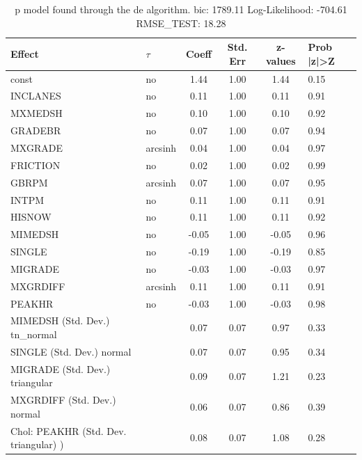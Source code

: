\begin{table}
	\caption{p model found through the de algorithm. bic: 1789.11 Log-Likelihood: -704.61 RMSE_TEST: 18.28}
	\begin{center}
		\begin{tabular}{|l|l|c|c|c|l|}
			\hline
			Effect & $\tau$ & Coeff & Std. Err & z-values & Prob |z|>Z \\
			\hline
			const & no & 1.44 & 1.00 & 1.44 & 0.15 \\
			\hline
			INCLANES & no & 0.11 & 1.00 & 0.11 & 0.91 \\
			\hline
			MXMEDSH & no & 0.10 & 1.00 & 0.10 & 0.92 \\
			\hline
			GRADEBR & no & 0.07 & 1.00 & 0.07 & 0.94 \\
			\hline
			MXGRADE & arcsinh & 0.04 & 1.00 & 0.04 & 0.97 \\
			\hline
			FRICTION & no & 0.02 & 1.00 & 0.02 & 0.99 \\
			\hline
			GBRPM & arcsinh & 0.07 & 1.00 & 0.07 & 0.95 \\
			\hline
			INTPM & no & 0.11 & 1.00 & 0.11 & 0.91 \\
			\hline
			HISNOW & no & 0.11 & 1.00 & 0.11 & 0.92 \\
			\hline
			MIMEDSH & no & -0.05 & 1.00 & -0.05 & 0.96 \\
			\hline
			SINGLE & no & -0.19 & 1.00 & -0.19 & 0.85 \\
			\hline
			MIGRADE & no & -0.03 & 1.00 & -0.03 & 0.97 \\
			\hline
			MXGRDIFF & arcsinh & 0.11 & 1.00 & 0.11 & 0.91 \\
			\hline
			PEAKHR & no & -0.03 & 1.00 & -0.03 & 0.98 \\
			\hline
			MIMEDSH (Std. Dev.) tn_normal &  & 0.07 & 0.07 & 0.97 & 0.33 \\
			\hline
			SINGLE (Std. Dev.) normal &  & 0.07 & 0.07 & 0.95 & 0.34 \\
			\hline
			MIGRADE (Std. Dev.) triangular &  & 0.09 & 0.07 & 1.21 & 0.23 \\
			\hline
			MXGRDIFF (Std. Dev.) normal &  & 0.06 & 0.07 & 0.86 & 0.39 \\
			\hline
			 Chol: PEAKHR (Std. Dev. triangular) ) &  & 0.08 & 0.07 & 1.08 & 0.28 \\
			\hline
		\end{tabular}
	\end{center}
\end{table}